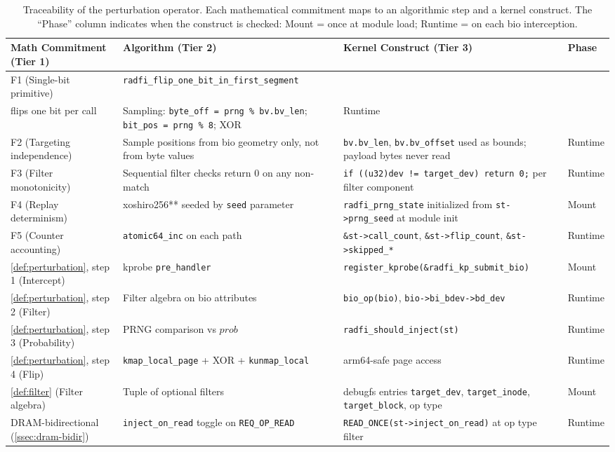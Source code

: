 \begin{table}[t]
\caption{Traceability of the perturbation operator. Each
mathematical commitment maps to an algorithmic step and a kernel
construct. The ``Phase'' column indicates when the construct is
checked: Mount = once at module load; Runtime = on each bio
interception.}
\label{tab:m2c-trace}
\centering
\small
\begin{tabular}{@{}p{3.2cm}p{4.6cm}p{6.5cm}l@{}}
\toprule
Math Commitment (Tier 1) & Algorithm (Tier 2) & Kernel Construct (Tier 3) & Phase \\
\midrule
F1 (Single-bit primitive) & \texttt{radfi\_flip\_one\_\allowbreak bit\_in\_\allowbreak first\_segment}\\flips one bit per call & Sampling: \texttt{byte\_off = prng \% bv.bv\_len}; \texttt{bit\_pos = prng \% 8}; XOR & Runtime \\
F2 (Targeting independence) & Sample positions from bio geometry only, not from byte values & \texttt{bv.bv\_len}, \texttt{bv.bv\_offset} used as bounds; payload bytes never read & Runtime \\
F3 (Filter monotonicity) & Sequential filter checks return 0 on any non-match & \texttt{if ((u32)dev != target\_dev) return 0;} per filter component & Runtime \\
F4 (Replay determinism) & xoshiro256** seeded by \texttt{seed} parameter & \texttt{radfi\_prng\_state} initialized from \texttt{st->prng\_seed} at module init & Mount \\
F5 (Counter accounting) & \texttt{atomic64\_inc} on each path & \texttt{\&st->call\_count}, \texttt{\&st->flip\_count}, \texttt{\&st->skipped\_*} & Runtime \\
\cref{def:perturbation}, step 1 (Intercept) & kprobe \texttt{pre\_handler} & \texttt{register\_\allowbreak kprobe(\&radfi\_kp\_\allowbreak submit\_bio)} & Mount \\
\cref{def:perturbation}, step 2 (Filter) & Filter algebra on bio attributes & \texttt{bio\_op(bio)}, \texttt{bio->bi\_bdev->bd\_dev} & Runtime \\
\cref{def:perturbation}, step 3 (Probability) & PRNG comparison vs \(\mathit{prob}\) & \texttt{radfi\_should\_inject(st)} & Runtime \\
\cref{def:perturbation}, step 4 (Flip) & \texttt{kmap\_local\_page} + XOR + \texttt{kunmap\_local} & arm64-safe page access~\cite{kernel-highmem} & Runtime \\
\cref{def:filter} (Filter algebra) & Tuple of optional filters & debugfs entries \texttt{target\_dev}, \texttt{target\_inode}, \texttt{target\_block}, op type & Mount \\
DRAM-bidirectional (\cref{ssec:dram-bidir}) & \texttt{inject\_on\_read} toggle on \texttt{REQ\_OP\_READ} & \texttt{READ\_ONCE(st->inject\_on\_read)} at op type filter & Runtime \\
\bottomrule
\end{tabular}
\end{table}

